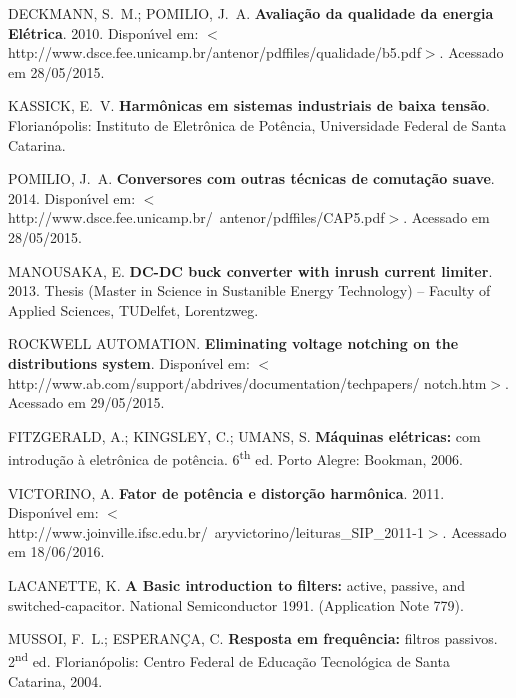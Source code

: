 \begin{thebibliography}{}
{DECKMANN, S.~M.; POMILIO, J.~A. \textbf{Avalia{\c{c}}{\~a}o da qualidade da
  energia El{\'e}trica}. 2010.
  Dispon{\'\i}vel em:
  $<$http://www.dsce.fee.unicamp.br/antenor/pdffiles/qualidade/b5.pdf$>$.
  Acessado em 28/05/2015.}


{KASSICK, E.~V. \textbf{Harm{\^o}nicas em sistemas industriais de baixa
  tens{\~a}o}.
Florian{\'o}polis: Instituto de Eletr\^onica de Pot\^encia,
  Universidade Federal de Santa Catarina.}

{POMILIO, J.~A. \textbf{Conversores com outras t{\'e}cnicas de
  comuta{\c{c}}{\~a}o suave}. 2014.
  Dispon{\'\i}vel em:
  $<$http://www.dsce.fee.unicamp.br/~antenor/pdffiles/CAP5.pdf$>$.}
  Acessado em 28/05/2015.


{MANOUSAKA, E.
\textbf{DC-DC buck converter with inrush current limiter}. 2013.
Thesis (Master in Science in Sustanible Energy Technology) -- Faculty of Applied Sciences, TUDelfet, Lorentzweg.}

{ROCKWELL AUTOMATION. \newblock \textbf{Eliminating voltage notching on the distributions
  system}.
  Dispon{\'\i}vel em:
  $<$http://www.ab.com/support/abdrives/documentation/techpapers/ notch.htm$>$.}
  Acessado em 29/05/2015.


{FITZGERALD, A.; KINGSLEY, C.; UMANS, S. \textbf{M{\'a}quinas el{\'e}tricas:} com
  introdu{\c{c}}{\~a}o {\`a} eletr{\^o}nica de pot{\^e}ncia. 6\textsuperscript{th} ed. Porto Alegre:
  Bookman, 2006.}

{VICTORINO, A. \textbf{Fator de pot\^encia e distor\c{c}\~ao harm\^onica}. 2011.
	Dispon{\'\i}vel em:
	$<$http://www.joinville.ifsc.edu.br/~aryvictorino/leituras\_SIP\_2011-1$>$. 
	Acessado em 18/06/2016.}


{LACANETTE, K. \textbf{A Basic introduction to filters:} active, passive, and
  switched-capacitor. National Semiconductor 1991. (Application Note 779).}

{MUSSOI, F.~L.; ESPERAN{\c{C}}A, C. \textbf{Resposta em frequ{\^e}ncia:} filtros
  passivos.
2\textsuperscript{nd} ed. Florian{\'o}polis: Centro Federal de Educa{\c{c}}{\~a}o
  Tecnol{\'o}gica de Santa Catarina, 2004.}


\end{thebibliography}
